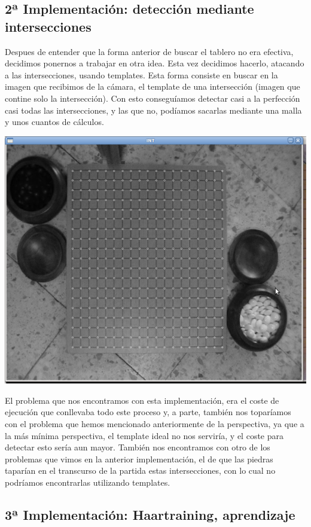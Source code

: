 \documentclass[12pt,a4papert,woside,openright,titlepage,final]{book}
\begin{document}
\subsection{2ª Implementación: detección mediante intersecciones}

Despues de entender que la forma anterior de buscar el tablero no era efectiva,
decidimos ponernos a trabajar en otra idea. Esta vez decidimos hacerlo, atacando
a las intersecciones, usando templates. Esta forma consiste en buscar en la
imagen que recibimos de la cámara, el template de una intersección (imagen
que contine solo la intersección). Con esto conseguíamos detectar casi a la
perfección casi todas las intersecciones, y las que no, podíamos sacarlas
mediante una malla y unos cuantos de cálculos.

\includegraphics[scale=0.6]{detec-intersecciones.png}

El problema que nos encontramos con esta implementación, era el coste de
ejecución que conllevaba todo este proceso y, a parte, también nos toparíamos
con el problema que hemos mencionado anteriormente de la perspectiva, ya que a
la más mínima perspectiva, el template ideal no nos serviría, y el coste para
detectar esto sería aun mayor. 
También nos encontramos con otro de los problemas que vimos en la anterior
implementación, el de que las piedras taparían en el transcurso de la partida
estas intersecciones, con lo cual no podríamos encontrarlas utilizando
templates.

\subsection{3ª Implementación: Haartraining, aprendizaje}
\end{document}
